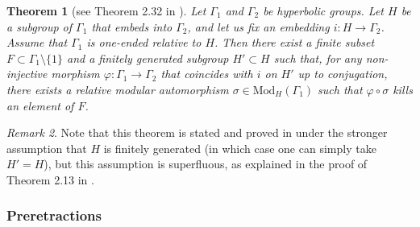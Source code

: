 \documentclass[a4paper, 11pt]{amsart}
\newtheorem{te}{Theorem}[section]
\theoremstyle{definition}
\newtheorem{de}[te]{Definition}
\theoremstyle{remark}
\newtheorem{rk}[te]{Remark}
\begin{document}



\begin{te}[see Theorem 2.32 in \cite{And18b}]\label{shortening}Let $\Gamma_1$ and $\Gamma_2$ be hyperbolic groups. Let $H$ be a subgroup of $\Gamma_1$ that embeds into $\Gamma_2$, and let us fix an embedding $i:H\rightarrow \Gamma_2$. Assume that $\Gamma_1$ is one-ended relative to $H$. Then there exist a finite subset $F \subset \Gamma_1\setminus\lbrace 1\rbrace$ and a finitely generated subgroup $H'\subset H$ such that, for any non-injective morphism $\varphi:\Gamma_1\rightarrow \Gamma_2$ that coincides with $i$ on $H'$ up to conjugation,
there exists a relative modular automorphism $\sigma\in\mathrm{Mod}_H(\Gamma_1)$ such that $\varphi\circ\sigma$ kills an element of $F$.
\end{te}

\begin{rk}
Note that this theorem is stated and proved in \cite{And18b} under the stronger assumption that $H$ is finitely generated (in which case one can simply take $H'=H$), but this assumption is superfluous, as explained in the proof of Theorem 2.13 in \cite{And21b}.
\end{rk}

\subsubsection{Preretractions}

\end{document}
